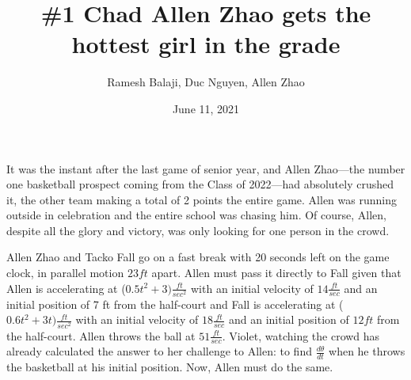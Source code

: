 \documentclass[xcolor={usenames, dvipsnames}]{beamer}
\title{\#1 Chad Allen Zhao gets the hottest girl in the grade}
\author{Ramesh Balaji, Duc Nguyen, Allen Zhao}
\date{June 11, 2021}
\begin{document}
\frame{\titlepage}

\begin{frame}
	It was the instant after the last game of senior year, and Allen Zhao—the number one basketball prospect coming from the Class of 2022—had absolutely crushed it, the other team making a total of 2 points the entire game. Allen was running outside in celebration and the entire school was chasing him. Of course, Allen, despite all the glory and victory, was only looking for one person in the crowd.
\end{frame}

\begin{frame}

    Allen Zhao and Tacko Fall go on a fast break with 20 seconds left on the game clock, in parallel
    motion $23 ft$ apart. 
Allen must pass it directly to Fall given that Allen is accelerating at ($0.5t^2+3)\frac{ft}{sec^2}$
with an initial velocity of $14 \frac{ft}{sec}$ and an initial position of 7 ft from the half-court and Fall is accelerating at ($0.6t^2+3t) \frac{ft}{sec^2}$
with an initial velocity of $18 \frac{ft}{sec}$ and an initial position of $12ft$ from the half-court. Allen throws the ball at 
$51 \frac{ft}{sec}$. Violet, watching the crowd has already calculated the answer to 
her challenge to Allen: to find $\frac{d\theta}{dt}$ when he throws the basketball at his
initial position. Now, Allen must do the same. 

\end{frame}
\end{document}
